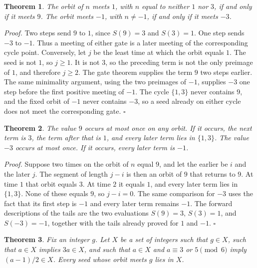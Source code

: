 \documentclass[11pt,letterpaper]{article}
\newtheorem{theorem}{Theorem}
\newenvironment{proof}{\noindent\textit{Proof.}}{\hfill\(\square\)}
\begin{document}
\begin{theorem}
\label{thm:external}
The orbit of \(n\) meets \(1\), with \(n\) equal to neither \(1\) nor \(3\), if and only if it meets \(9\). The orbit meets \(-1\), with \(n\ne -1\), if and only if it meets \(-3\).
\end{theorem}

\begin{proof}
Two steps send \(9\) to \(1\), since \(S(9)=3\) and \(S(3)=1\). One step sends \(-3\) to \(-1\). Thus a meeting of either gate is a later meeting of the corresponding cycle point. Conversely, let \(j\) be the least time at which the orbit equals \(1\). The seed is not \(1\), so \(j\ge 1\). It is not \(3\), so the preceding term is not the only preimage of \(1\), and therefore \(j\ge 2\). The gate theorem supplies the term \(9\) two steps earlier. The same minimality argument, using the two preimages of \(-1\), supplies \(-3\) one step before the first positive meeting of \(-1\). The cycle \(\{1,3\}\) never contains \(9\), and the fixed orbit of \(-1\) never contains \(-3\), so a seed already on either cycle does not meet the corresponding gate.
\end{proof}

\begin{theorem}
\label{thm:once}
The value \(9\) occurs at most once on any orbit. If it occurs, the next term is \(3\), the term after that is \(1\), and every later term lies in \(\{1,3\}\). The value \(-3\) occurs at most once. If it occurs, every later term is \(-1\).
\end{theorem}

\begin{proof}
Suppose two times on the orbit of \(n\) equal \(9\), and let the earlier be \(i\) and the later \(j\). The segment of length \(j-i\) is then an orbit of \(9\) that returns to \(9\). At time \(1\) that orbit equals \(3\). At time \(2\) it equals \(1\), and every later term lies in \(\{1,3\}\). None of these equals \(9\), so \(j-i=0\). The same comparison for \(-3\) uses the fact that its first step is \(-1\) and every later term remains \(-1\). The forward descriptions of the tails are the two evaluations \(S(9)=3\), \(S(3)=1\), and \(S(-3)=-1\), together with the tails already proved for \(1\) and \(-1\).
\end{proof}

\begin{theorem}
\label{thm:generated}
Fix an integer \(g\). Let \(X\) be a set of integers such that \(g\in X\), such that \(a\in X\) implies \(3a\in X\), and such that \(a\in X\) and \(a\equiv 3\) or \(5\pmod{6}\) imply \((a-1)/2\in X\). Every seed whose orbit meets \(g\) lies in \(X\).
\end{theorem}
\end{document}

